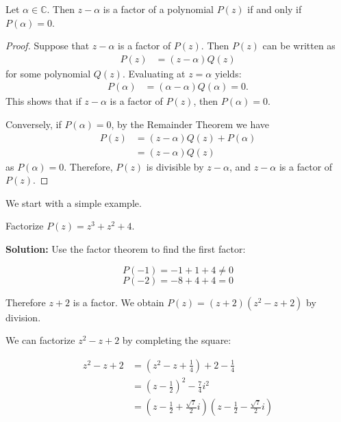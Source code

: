 \begin{theorem}
    Let \(\alpha \in \mathbb{C}\). Then \(z - \alpha\) is a factor of a polynomial \(P(z)\) if and only if \(P(\alpha) = 0\).
\end{theorem}
\begin{proof}
    Suppose that \( z - \alpha \) is a factor of \( P(z) \). Then \( P(z) \) can be written as
    \begin{equation}
    \begin{aligned}
        P(z) &= (z - \alpha)Q(z)
    \end{aligned}
    \end{equation}
    for some polynomial \( Q(z) \). Evaluating at \( z = \alpha \) yields:
    \begin{equation}
    \begin{aligned}
        P(\alpha) &= (\alpha - \alpha)Q(\alpha) = 0.
    \end{aligned}
    \end{equation}
    This shows that if \( z - \alpha \) is a factor of \( P(z) \), then \( P(\alpha) = 0 \).
    
    Conversely, if \( P(\alpha) = 0 \), by the Remainder Theorem we have
    \begin{equation}
    \begin{aligned}
        P(z) &= (z - \alpha)Q(z) + P(\alpha) \\
             &= (z - \alpha)Q(z)
    \end{aligned}
    \end{equation}
    as \( P(\alpha) = 0 \). Therefore, \( P(z) \) is divisible by \( z - \alpha \), and \( z - \alpha \) is a factor of \( P(z) \).
    \end{proof}
We start with a simple example.
\begin{example}
    Factorize \( P(z) = z^3 + z^2 + 4 \).
\end{example}
\textbf{Solution:}
Use the factor theorem to find the first factor:

\[
P(-1) = -1 + 1 + 4 \neq 0
\]
\[
P(-2) = -8 + 4 + 4 = 0
\]

Therefore \( z + 2 \) is a factor. We obtain \( P(z) = (z + 2)(z^2 - z + 2) \) by division.

We can factorize \( z^2 - z + 2 \) by completing the square:

\begin{equation*}
\begin{aligned}
z^2 - z + 2 &= \left(z^2 - z + \frac{1}{4}\right) + 2 - \frac{1}{4} \\
            &= \left(z - \frac{1}{2}\right)^2 - \frac{7}{4}i^2 \\
            &= \left(z - \frac{1}{2} + \frac{\sqrt{7}}{2}i\right)\left(z - \frac{1}{2} - \frac{\sqrt{7}}{2}i\right)
\end{aligned}
\end{equation*}

